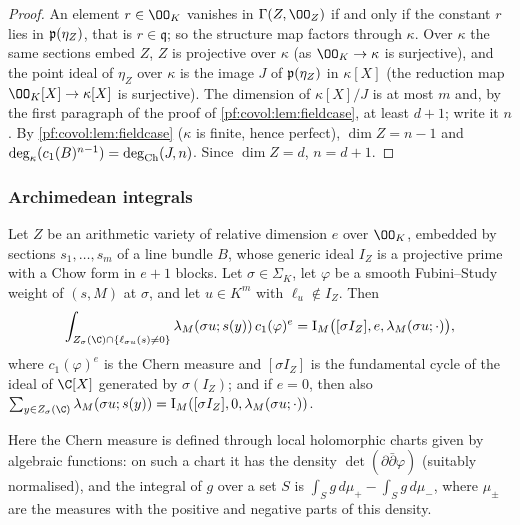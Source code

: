 \begin{proof}
An element $r\in\OO_K$ vanishes in $\Gamma(Z,\OO_Z)$ if and only if the constant $r$ lies in
$\mathfrak{p}(\eta_Z)$, that is $r\in\mathfrak q$; so the structure map factors through $\kappa$. Over
$\kappa$ the same sections embed $Z$, $Z$ is projective over $\kappa$ (as $\OO_K\to\kappa$ is surjective),
and the point ideal of $\eta_Z$ over $\kappa$ is the image $J$ of $\mathfrak{p}(\eta_Z)$ in $\kappa[X]$ (the
reduction map $\OO_K[X]\to\kappa[X]$ is surjective). The dimension of $\kappa[X]/J$ is at most $m$ and, by
the first paragraph of the proof of \cref{pf:covol:lem:fieldcase}, at least $d+1$; write it $n$. By
\cref{pf:covol:lem:fieldcase} ($\kappa$ is finite, hence perfect), $\dim Z=n-1$ and
$\deg_\kappa(c_1(B)^{n-1})=\operatorname{deg}_{\mathrm{Ch}}(J,n)$. Since $\dim Z=d$, $n=d+1$.
\end{proof}

\subsubsection*{Archimedean integrals}

\begin{proposition}\label{pf:covol:prop:arch}
Let $Z$ be an arithmetic variety of relative dimension $e$ over $\OO_K$, embedded by sections
$s_1,\dots,s_m$ of a line bundle $B$, whose generic ideal $I_Z$ is a projective prime with a Chow form in
$e+1$ blocks. Let $\sigma\in\Sigma_K$, let $\varphi$ be a smooth Fubini--Study weight of $(s,M)$ at
$\sigma$, and let $u\in K^m$ with $\ell_u\notin I_Z$. Then
\[
\int_{Z_\sigma(\C)\cap\{\ell_{\sigma u}(s)\ne0\}}\covolFs_M(\sigma u;s(y))\,c_1(\varphi)^e=
\covolCyc_M\bigl([\sigma I_Z],e,\covolFs_M(\sigma u;\cdot)\bigr),
\]
where $c_1(\varphi)^e$ is the Chern measure and $[\sigma I_Z]$ is the fundamental cycle of the ideal of
$\C[X]$ generated by $\sigma(I_Z)$; and if $e=0$, then also
$\sum_{y\in Z_\sigma(\C)}\covolFs_M(\sigma u;s(y))=\covolCyc_M([\sigma I_Z],0,\covolFs_M(\sigma u;\cdot))$.
\end{proposition}

Here the Chern measure is defined through local holomorphic charts given by algebraic functions: on such
a chart it has the density $\det(\partial\bar\partial\varphi)$ (suitably normalised), and the integral of
$g$ over a set $S$ is $\int_Sg\,d\mu_+-\int_Sg\,d\mu_-$, where $\mu_\pm$ are the measures with the positive and
negative parts of this density.

